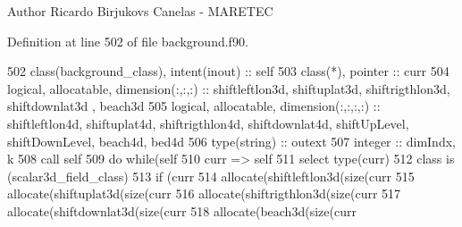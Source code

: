 \begin{DoxyAuthor}{Author}
Ricardo Birjukovs Canelas -\/ M\+A\+R\+E\+T\+EC 
\end{DoxyAuthor}


Definition at line 502 of file background.\+f90.


\begin{DoxyCode}
502     \textcolor{keywordtype}{class}(background\_class), \textcolor{keywordtype}{intent(inout)} :: self
503     \textcolor{keywordtype}{class}(*), \textcolor{keywordtype}{pointer} :: curr
504     \textcolor{keywordtype}{logical}, \textcolor{keywordtype}{allocatable}, \textcolor{keywordtype}{dimension(:,:,:)} :: shiftleftlon3d, shiftuplat3d, shiftrigthlon3d, shiftdownlat3d
      , beach3d
505     \textcolor{keywordtype}{logical}, \textcolor{keywordtype}{allocatable}, \textcolor{keywordtype}{dimension(:,:,:,:)} :: shiftleftlon4d, shiftuplat4d, shiftrigthlon4d, 
      shiftdownlat4d, shiftUpLevel, shiftDownLevel, beach4d, bed4d
506     \textcolor{keywordtype}{type}(string) :: outext
507     \textcolor{keywordtype}{integer} :: dimIndx, k
508     \textcolor{keyword}{call }self%
509     \textcolor{keywordflow}{do} \textcolor{keywordflow}{while}(self%
510         curr => self%
511         \textcolor{keywordflow}{select type}(curr)
512 \textcolor{keywordflow}{        class is} (scalar3d\_field\_class)
513             \textcolor{keywordflow}{if} (curr%
514                 \textcolor{keyword}{allocate}(shiftleftlon3d(\textcolor{keyword}{size}(curr%
515                 \textcolor{keyword}{allocate}(shiftuplat3d(\textcolor{keyword}{size}(curr%
516                 \textcolor{keyword}{allocate}(shiftrigthlon3d(\textcolor{keyword}{size}(curr%
517                 \textcolor{keyword}{allocate}(shiftdownlat3d(\textcolor{keyword}{size}(curr%
518                 \textcolor{keyword}{allocate}(beach3d(\textcolor{keyword}{size}(curr%

\end{DoxyCode}
